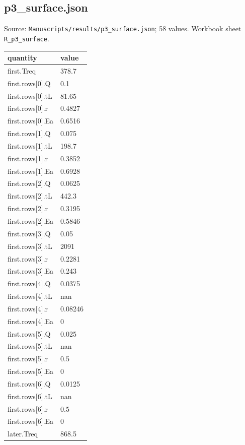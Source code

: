 \subsection*{p3\_surface.json}
\noindent\small Source: \nolinkurl{Manuscripts/results/p3_surface.json}; 58 values. Workbook sheet \texttt{R\_p3\_surface}.\par
{\scriptsize\begin{longtable}{p{}p{}}\toprule\textbf{quantity} & \textbf{value}\\\midrule\endhead
{}first.Treq & 378.7\\
{}first.rows[0].Q & 0.1\\
{}first.rows[0].tL & 81.65\\
{}first.rows[0].r & 0.4827\\
{}first.rows[0].Ea & 0.6516\\
{}first.rows[1].Q & 0.075\\
{}first.rows[1].tL & 198.7\\
{}first.rows[1].r & 0.3852\\
{}first.rows[1].Ea & 0.6928\\
{}first.rows[2].Q & 0.0625\\
{}first.rows[2].tL & 442.3\\
{}first.rows[2].r & 0.3195\\
{}first.rows[2].Ea & 0.5846\\
{}first.rows[3].Q & 0.05\\
{}first.rows[3].tL & 2091\\
{}first.rows[3].r & 0.2281\\
{}first.rows[3].Ea & 0.243\\
{}first.rows[4].Q & 0.0375\\
{}first.rows[4].tL & nan\\
{}first.rows[4].r & 0.08246\\
{}first.rows[4].Ea & 0\\
{}first.rows[5].Q & 0.025\\
{}first.rows[5].tL & nan\\
{}first.rows[5].r & 0.5\\
{}first.rows[5].Ea & 0\\
{}first.rows[6].Q & 0.0125\\
{}first.rows[6].tL & nan\\
{}first.rows[6].r & 0.5\\
{}first.rows[6].Ea & 0\\
{}later.Treq & 868.5\\

\end{longtable}}
